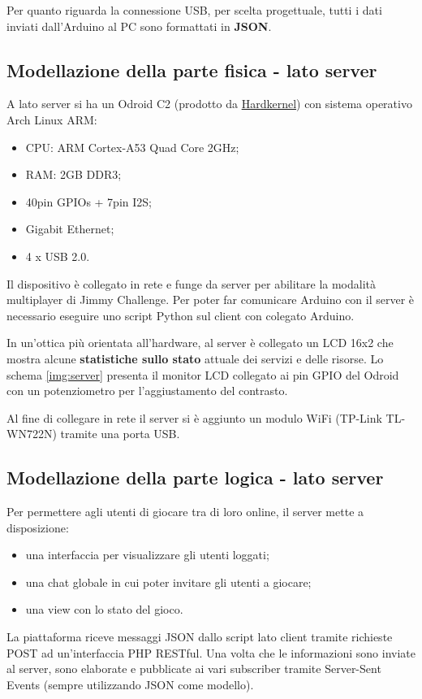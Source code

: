 Per quanto riguarda la connessione USB, per scelta progettuale, tutti i dati inviati dall'Arduino al PC sono formattati in \textbf{JSON}.

\subsection{Modellazione della parte fisica - lato server}
A lato server si ha un Odroid C2 (prodotto da \href{http://www.hardkernel.com/main/main.php}{Hardkernel}) con sistema operativo Arch Linux ARM:
\begin{itemize}
	\item CPU: ARM Cortex-A53 Quad Core 2GHz;
	\item RAM: 2GB DDR3;
	\item 40pin GPIOs + 7pin I2S;
	\item Gigabit Ethernet;
	\item 4 x USB 2.0.
\end{itemize}
Il dispositivo è collegato in rete e funge da server per abilitare la modalità multiplayer di Jimmy Challenge. Per poter far comunicare Arduino con il server è necessario eseguire uno script Python sul client con colegato Arduino.

In un'ottica più orientata all'hardware, al server è collegato un LCD 16x2 che mostra alcune \textbf{statistiche sullo stato} attuale dei servizi e delle risorse. Lo schema \ref{img:server} presenta il monitor LCD collegato ai pin GPIO del Odroid con un potenziometro per l'aggiustamento del contrasto.

Al fine di collegare in rete il server si è aggiunto un modulo WiFi (TP-Link TL-WN722N) tramite una porta USB.

\subsection{Modellazione della parte logica - lato server}
Per permettere agli utenti di giocare tra di loro online, il server mette a disposizione:
\begin{itemize}
	\item una interfaccia per visualizzare gli utenti loggati;
	\item una chat globale in cui poter invitare gli utenti a giocare;
	\item una view con lo stato del gioco.
\end{itemize}
La piattaforma riceve messaggi JSON dallo script lato client tramite richieste POST ad un'interfaccia PHP RESTful. Una volta che le informazioni sono inviate al server, sono elaborate e pubblicate ai vari subscriber tramite Server-Sent Events (sempre utilizzando JSON come modello).

